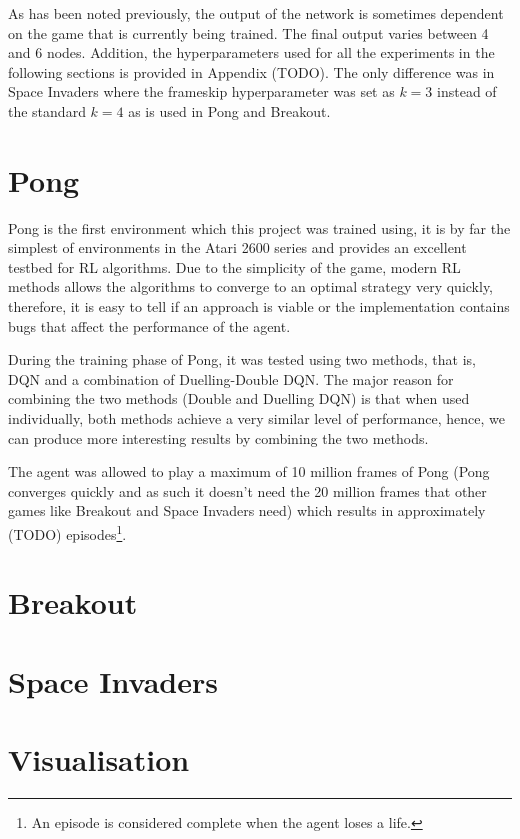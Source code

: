 As has been noted previously, the output of the network is sometimes dependent on the game that is currently being trained. The final output varies between 4 and 6 nodes. Addition, the hyperparameters used for all the experiments in the following sections is provided in Appendix (TODO). The only difference was in Space Invaders where the frameskip hyperparameter was set as $k = 3$ instead of the standard $k = 4$ as is used in Pong and Breakout.

\section{Pong}
Pong is the first environment which this project was trained using, it is by far the simplest of environments in the Atari 2600 series and provides an excellent testbed for RL algorithms. Due to the simplicity of the game, modern RL methods allows the algorithms to converge to an optimal strategy very quickly, therefore, it is easy to tell if an approach is viable or the implementation contains bugs that affect the performance of the agent.

During the training phase of Pong, it was tested using two methods, that is, DQN and a combination of Duelling-Double DQN. The major reason for combining the two methods (Double and Duelling DQN) is that when used individually, both methods achieve a very similar level of performance, hence, we can produce more interesting results by combining the two methods.

The agent was allowed to play a maximum of 10 million frames of Pong (Pong converges quickly and as such it doesn't need the 20 million frames that other games like Breakout and Space Invaders need) which results in approximately (TODO) episodes\footnote{An episode is considered complete when the agent loses a life.}.

\section{Breakout}

\section{Space Invaders}

\section{Visualisation}
